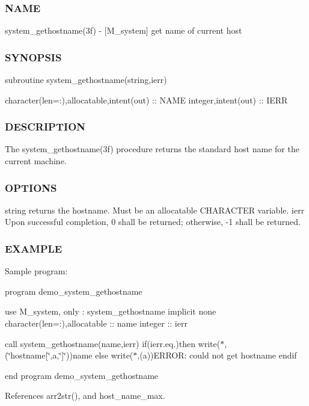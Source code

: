 \subsubsection*{N\+A\+ME}

system\+\_\+gethostname(3f) -\/ \mbox{[}M\+\_\+system\mbox{]} get name of current host \subsubsection*{S\+Y\+N\+O\+P\+S\+IS}

subroutine system\+\_\+gethostname(string,ierr)

character(len=\+:),allocatable,intent(out) \+:\+: N\+A\+ME integer,intent(out) \+:\+: I\+E\+RR \subsubsection*{D\+E\+S\+C\+R\+I\+P\+T\+I\+ON}

The system\+\_\+gethostname(3f) procedure returns the standard host name for the current machine.

\subsubsection*{O\+P\+T\+I\+O\+NS}

string returns the hostname. Must be an allocatable C\+H\+A\+R\+A\+C\+T\+ER variable. ierr Upon successful completion, 0 shall be returned; otherwise, -\/1 shall be returned. \subsubsection*{E\+X\+A\+M\+P\+LE}

Sample program\+:

program demo\+\_\+system\+\_\+gethostname

use M\+\_\+system, only \+: system\+\_\+gethostname implicit none character(len=\+:),allocatable \+:\+: name integer \+:\+: ierr

call system\+\_\+gethostname(name,ierr) if(ierr.\+eq.)then write($\ast$,\textquotesingle{}(\char`\"{}hostname\mbox{[}\char`\"{},a,\char`\"{}\mbox{]}\char`\"{})\textquotesingle{})name else write($\ast$,\textquotesingle{}(a)\textquotesingle{})\textquotesingle{}E\+R\+R\+OR\+: could not get hostname\textquotesingle{} endif

end program demo\+\_\+system\+\_\+gethostname 

References arr2str(), and host\+\_\+name\+\_\+max.

